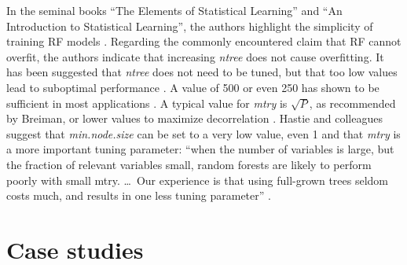 In the seminal books ``The Elements of Statistical Learning'' and ``An
Introduction to Statistical Learning'', the authors highlight the simplicity of
training \gls{RF} models
 \cite{hastieElementsStatisticalLearning2001,jamesIntroductionStatisticalLearning2021a}.
Regarding the commonly encountered claim that \gls{RF} cannot overfit, the authors
indicate that increasing \textit{ntree} does not cause overfitting. It has been
suggested that \textit{ntree} does not need to be tuned, but that too low values
lead to suboptimal performance
 \cite{oshiroHowManyTrees2012,probstTuneNotTune2018}. A value of 500 or even 250
has shown to be sufficient in most applications
 \cite{oshiroHowManyTrees2012}. A typical value for \textit{mtry} is $\sqrt{P}$,
as recommended by Breiman, or lower values to maximize decorrelation
 \cite{hastieElementsStatisticalLearning2001}. Hastie and colleagues suggest that
\textit{min.node.size} can be set to a very low value, even 1 and that
\textit{mtry} is a more important tuning parameter: ``when the number of
variables is large, but the fraction of relevant variables small, random forests
are likely to perform poorly with small mtry. \ldots\ Our experience is that
using full-grown trees seldom costs much, and results in one less tuning
parameter'' \cite{hastieElementsStatisticalLearning2001}.

\section{Case studies}
\label{sec:3.3}

